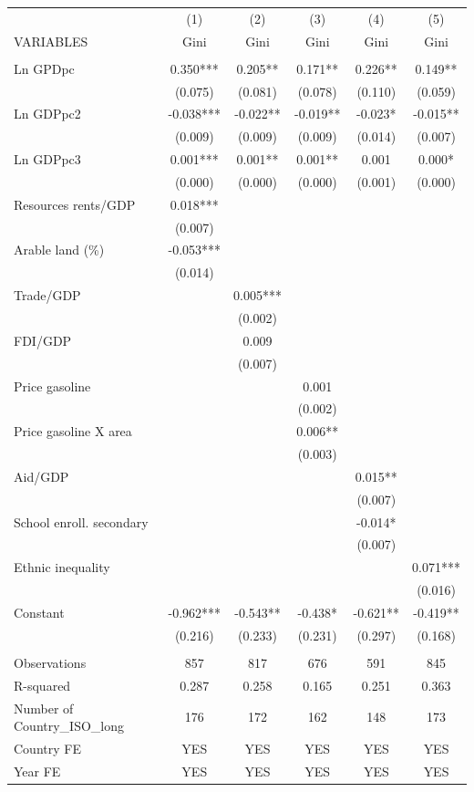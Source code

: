 \begin{tabular}{lccccc} \hline
 & (1) & (2) & (3) & (4) & (5) \\
VARIABLES & Gini & Gini & Gini & Gini & Gini \\ \hline
 &  &  &  &  &  \\
Ln GPDpc & 0.350*** & 0.205** & 0.171** & 0.226** & 0.149** \\
 & (0.075) & (0.081) & (0.078) & (0.110) & (0.059) \\
Ln GDPpc2 & -0.038*** & -0.022** & -0.019** & -0.023* & -0.015** \\
 & (0.009) & (0.009) & (0.009) & (0.014) & (0.007) \\
Ln GDPpc3 & 0.001*** & 0.001** & 0.001** & 0.001 & 0.000* \\
 & (0.000) & (0.000) & (0.000) & (0.001) & (0.000) \\
Resources rents/GDP & 0.018*** &  &  &  &  \\
 & (0.007) &  &  &  &  \\
Arable land (\%) & -0.053*** &  &  &  &  \\
 & (0.014) &  &  &  &  \\
Trade/GDP &  & 0.005*** &  &  &  \\
 &  & (0.002) &  &  &  \\
FDI/GDP &  & 0.009 &  &  &  \\
 &  & (0.007) &  &  &  \\
Price gasoline &  &  & 0.001 &  &  \\
 &  &  & (0.002) &  &  \\
Price gasoline X area &  &  & 0.006** &  &  \\
 &  &  & (0.003) &  &  \\
Aid/GDP &  &  &  & 0.015** &  \\
 &  &  &  & (0.007) &  \\
School enroll. secondary &  &  &  & -0.014* &  \\
 &  &  &  & (0.007) &  \\
Ethnic inequality &  &  &  &  & 0.071*** \\
 &  &  &  &  & (0.016) \\
Constant & -0.962*** & -0.543** & -0.438* & -0.621** & -0.419** \\
 & (0.216) & (0.233) & (0.231) & (0.297) & (0.168) \\
 &  &  &  &  &  \\
Observations & 857 & 817 & 676 & 591 & 845 \\
R-squared & 0.287 & 0.258 & 0.165 & 0.251 & 0.363 \\
Number of Country\_ISO\_long & 176 & 172 & 162 & 148 & 173 \\
Country FE & YES & YES & YES & YES & YES \\
 Year FE & YES & YES & YES & YES & YES \\ \hline
\end{tabular}
